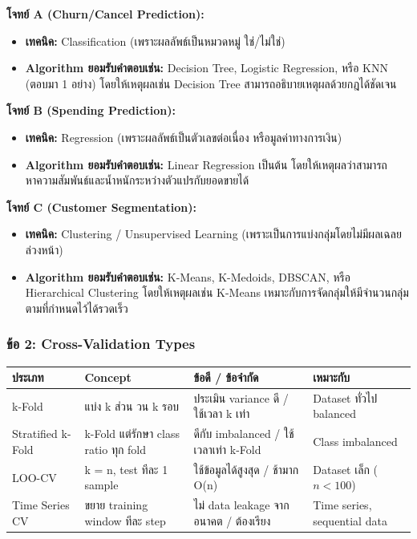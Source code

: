 \documentclass[a4paper,12pt]{article}
\begin{document}
\textbf{โจทย์ A (Churn/Cancel Prediction):} 
\begin{itemize}
    \item \textbf{เทคนิค:} Classification (เพราะผลลัพธ์เป็นหมวดหมู่ ใช่/ไม่ใช่)
    \item \textbf{Algorithm ยอมรับคำตอบเช่น:} Decision Tree, Logistic Regression, หรือ KNN (ตอบมา 1 อย่าง) โดยให้เหตุผลเช่น Decision Tree สามารถอธิบายเหตุผลด้วยกฎได้ชัดเจน
\end{itemize}

\textbf{โจทย์ B (Spending Prediction):} 
\begin{itemize}
    \item \textbf{เทคนิค:} Regression (เพราะผลลัพธ์เป็นตัวเลขต่อเนื่อง หรือมูลค่าทางการเงิน)
    \item \textbf{Algorithm ยอมรับคำตอบเช่น:} Linear Regression เป็นต้น โดยให้เหตุผลว่าสามารถหาความสัมพันธ์และน้ำหนักระหว่างตัวแปรกับยอดขายได้
\end{itemize}

\textbf{โจทย์ C (Customer Segmentation):} 
\begin{itemize}
    \item \textbf{เทคนิค:} Clustering / Unsupervised Learning (เพราะเป็นการแบ่งกลุ่มโดยไม่มีผลเฉลยล่วงหน้า)
    \item \textbf{Algorithm ยอมรับคำตอบเช่น:} K-Means, K-Medoids, DBSCAN, หรือ Hierarchical Clustering โดยให้เหตุผลเช่น K-Means เหมาะกับการจัดกลุ่มให้มีจำนวนกลุ่มตามที่กำหนดไว้ได้รวดเร็ว
\end{itemize}

\subsubsection*{ข้อ 2: Cross-Validation Types}

\begin{center}
\renewcommand{\arraystretch}{1.25}
\small
\begin{tabular}{|p{2.8cm}|p{3.2cm}|p{3.2cm}|p{3.0cm}|}
    \hline
    \rowcolor{cyan!15}
    \textbf{ประเภท} & \textbf{Concept} & \textbf{ข้อดี / ข้อจำกัด} & \textbf{เหมาะกับ} \\
    \hline
    k-Fold & แบ่ง k ส่วน วน k รอบ & ประเมิน variance ดี / ใช้เวลา k เท่า & Dataset ทั่วไป balanced \\
    \hline
    Stratified k-Fold & k-Fold แต่รักษา class ratio ทุก fold & ดีกับ imbalanced / ใช้เวลาเท่า k-Fold & Class imbalanced \\
    \hline
    LOO-CV & k = n, test ทีละ 1 sample & ใช้ข้อมูลได้สูงสุด / ช้ามาก O(n) & Dataset เล็ก ($n < 100$) \\
    \hline
    Time Series CV & ขยาย training window ทีละ step & ไม่ data leakage จากอนาคต / ต้องเรียง & Time series, sequential data \\
    \hline
\end{tabular}
\end{center}
\end{document}
